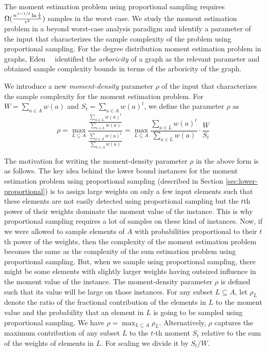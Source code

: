 The moment estimation problem using proportional sampling requires $\Omega(\frac{n^{1-1/t}\ln\frac{1}{\delta}}{\epsilon^2})$ samples in the worst case. We study the moment estimation problem in a beyond worst-case analysis paradigm and identify a parameter of the input that characterizes the sample complexity of the problem using proportional sampling. For the degree distribution moment estimation problem in graphs, Eden~\etal~\cite{ERS2019} identified the {\it arboricity} of a graph as the relevant parameter and obtained sample complexity bounds in terms of the arboricity of the graph.

We introduce a new \textit{moment-density} parameter $\rho$ of the input that characterizes the sample complexity for the moment estimation problem. For $W=\sum_{a\in A} w(a)$ and $S_t=\sum_{a\in A} w(a)^t$, we define the parameter $\rho$ as $$\rho=\max_{L\subseteq A} \frac{\frac{\sum_{a\in L} w(a)^t}{\sum_{a\in L} w(a)}}{\frac{\sum_{a\in A} w(a)^t}{\sum_{a\in A} w(a)}}=\max_{L\subseteq A} \frac{\sum_{a\in L} w(a)^t}{\sum_{a\in L} w(a)} \cdot \frac{W}{S_t}$$ 

The motivation for writing the moment-density parameter $\rho$ in the above form is as follows. The key idea behind the lower bound instances for the moment estimation problem using proportional sampling (described in Section \ref{sec:lower-proportional}) is to assign large weights on only a few input elements such that these elements are not easily detected using proportional sampling but the $t$th power of their weights dominate the moment value of the instance. This is why proportional sampling requires a lot of samples on these kind of instances. Now, if we were allowed to sample elements of $A$ with probabilities proportional to their $t$th power of the weights, then the complexity of the moment estimation problem becomes the same as the complexity of the sum estimation problem using proportional sampling. But, when we sample using proportional sampling, there might be some elements with slightly larger weights having outsized influence in the moment value of the instance. The moment-density parameter $\rho$ is defined such that its value will be large on those instances. For any subset $L\subseteq A$, let $\rho_L$ denote the ratio of the fractional contribution of the elements in $L$ to the moment value and the probability that an element in $L$ is going to be sampled using proportional sampling. We have $\rho=\max_{L\subseteq A} \rho_L$. Alternatively, $\rho$ captures the maximum contribution of any subset $L$ to the $t$-th moment $S_t$ relative to the sum of the weights of elements in $L$. For scaling we divide it by $S_t/W$.

